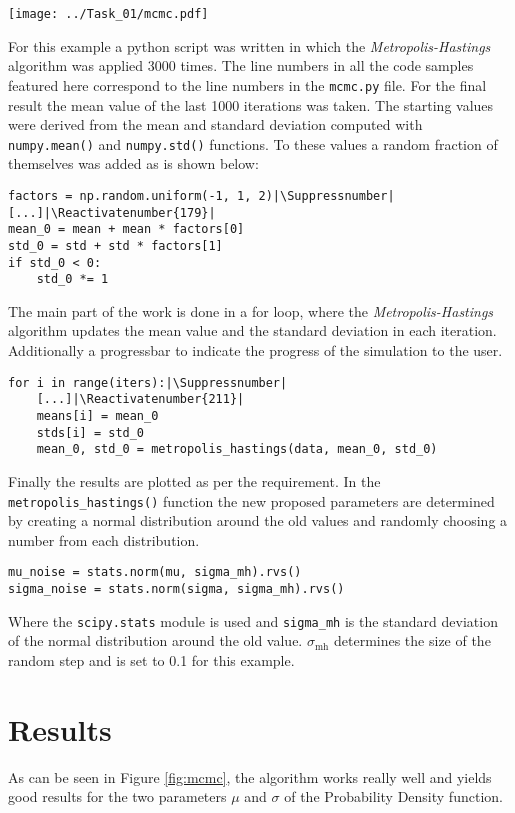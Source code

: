 \documentclass{aa}
\begin{document}
\begin{figure*}[h]
	\centering
		\texttt{[image: ../Task\_01/mcmc.pdf]}
	\caption{\textbf{Top left:} The evolution of the mean with respect to the number of
    iterations. \textbf{Top right:} The evolution of the standard deviation with respect to the
    number of iterations. \textbf{Lower left:} This shows the trail of the random walk in the
    \(\mu-\sigma\) parameter space. The green marker shows the staring point, i.e. the initial
    values, and the red dot marks the endpoint. \textbf{Lower right:} Here is the Data plotted
    in a Histogram where the bin width is one. Additionally there are two PDFs plotted. The
    orange curve shows the PDF where mean and standard deviation are the mean values of the
    last 1000 iterations from the MCMC method and the blue curve shows the PDF with a mean and
    standard deviation determined with numpy.}
	\label{fig:mcmc}
\end{figure*}
For this example a python script was written in which the \emph{Metropolis-Hastings} algorithm
was applied 3000 times. The line numbers in all the code samples featured here correspond to
the line numbers in the \verb+mcmc.py+ file. For the final result the mean value of the last
1000 iterations was taken. The starting values were derived from the mean and standard
deviation computed with \verb+numpy.mean()+ and \verb+numpy.std()+ functions. To these values a
random fraction of themselves was added as is shown below:
\begin{lstlisting}[firstnumber=172]
factors = np.random.uniform(-1, 1, 2)|\Suppressnumber|
[...]|\Reactivatenumber{179}|
mean_0 = mean + mean * factors[0]
std_0 = std + std * factors[1]
if std_0 < 0:
    std_0 *= 1
\end{lstlisting}
The main part of the work is done in a for loop, where the \emph{Metropolis-Hastings} algorithm
updates the mean value and the standard deviation in each iteration. Additionally a progressbar
to indicate the progress of the simulation to the user.
\begin{lstlisting}[firstnumber=203]
for i in range(iters):|\Suppressnumber|
    [...]|\Reactivatenumber{211}|
    means[i] = mean_0
    stds[i] = std_0
    mean_0, std_0 = metropolis_hastings(data, mean_0, std_0)
\end{lstlisting}
Finally the results are plotted as per the requirement. In the \verb+metropolis_hastings()+
function the new proposed parameters are determined by creating a normal distribution around
the old values and randomly choosing a number from each distribution.
\begin{lstlisting}[firstnumber=120]
mu_noise = stats.norm(mu, sigma_mh).rvs()
sigma_noise = stats.norm(sigma, sigma_mh).rvs()
\end{lstlisting}
Where the \verb+scipy.stats+ module is used and \verb+sigma_mh+ is the standard deviation of
the normal distribution around the old value. \(\sigma_\mathrm{mh}\) determines the size of the
random step and is set to 0.1 for this example.

\section{Results}%
\label{sec:results}

As can be seen in Figure \ref{fig:mcmc}, the algorithm works really well and yields good
results for the two parameters \(\mu\) and \(\sigma\) of the Probability Density function.
\end{document}
